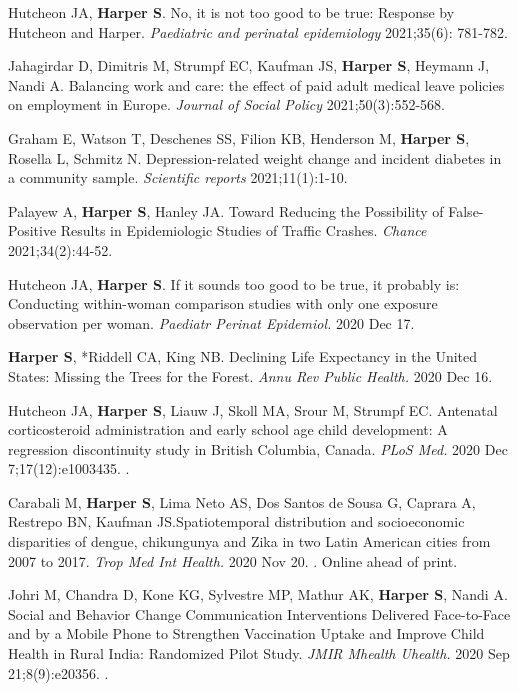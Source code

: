 \documentclass[
  letterpaper,
  DIV=11,
  numbers=noendperiod]{scrartcl}
\begin{document}
\begin{etaremune}
\item Hutcheon JA, \textbf{Harper S}. No, it is not too good to be true: Response by Hutcheon and Harper. \emph{Paediatric and perinatal epidemiology} 2021;35(6): 781-782.

\item Jahagirdar D, Dimitris M, Strumpf EC, Kaufman JS, \textbf{Harper S}, Heymann J, Nandi A. Balancing work and care: the effect of paid adult medical leave policies on employment in Europe. \emph{Journal of Social Policy} 2021;50(3):552-568.

\item Graham E, Watson T, Deschenes SS, Filion KB, Henderson M, \textbf{Harper S}, Rosella L, Schmitz N. Depression-related weight change and incident diabetes in a community sample. \emph{Scientific reports} 2021;11(1):1-10.

\item Palayew A, \textbf{Harper S}, Hanley JA. Toward Reducing the Possibility of False-Positive Results in Epidemiologic Studies of Traffic Crashes. \emph{Chance} 2021;34(2):44-52.

\item Hutcheon JA, \textbf{Harper S}. If it sounds too good to be true, it probably is: Conducting within-woman comparison studies with only one exposure observation per woman. \emph{Paediatr Perinat Epidemiol.} 2020 Dec 17. 

\item \textbf{Harper S}, *Riddell CA, King NB. Declining Life Expectancy in the United States: Missing the Trees for the Forest. \emph{Annu Rev Public Health.} 2020 Dec 16. 

\item Hutcheon JA, \textbf{Harper S}, Liauw J, Skoll MA, Srour M, Strumpf EC. Antenatal corticosteroid administration and early school age child development: A regression discontinuity study in British Columbia, Canada. \emph{PLoS Med.} 2020 Dec 7;17(12):e1003435. .

\item Carabali M, \textbf{Harper S}, Lima Neto AS, Dos Santos de Sousa G, Caprara A, Restrepo BN, Kaufman JS.Spatiotemporal distribution and socioeconomic disparities of dengue, chikungunya and Zika in two Latin American cities from 2007 to 2017. \emph{Trop Med Int Health.} 2020 Nov 20. . Online ahead of print.

\item Johri M, Chandra D, Kone KG, Sylvestre MP, Mathur AK, \textbf{Harper S}, Nandi A. Social and Behavior Change Communication Interventions Delivered Face-to-Face and by a Mobile Phone to Strengthen Vaccination Uptake and Improve Child Health in Rural India: Randomized Pilot Study. \emph{JMIR Mhealth Uhealth.} 2020 Sep 21;8(9):e20356. .


\end{etaremune}
\end{document}
